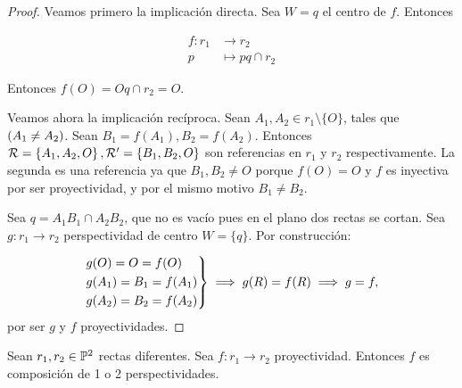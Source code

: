 \begin{proof}
    Veamos primero la implicación directa. Sea $W = {q}$
    el centro de $f$. Entonces

    \begin{align*}
	f : r_1 &\to r_2 \\
	p &\mapsto pq \cap r_2
    \end{align*}
    
    Entonces $f(O) = Oq \cap r_2 = O$.
    
    Veamos ahora la implicación recíproca. Sean $A_1, A_2 \in r_1
    \setminus \{O\}$, tales que $\left( A_1 \neq A_2\right)$. 
    Sean $B_1 = f(A_1), B_2 = f(A_2)$. Entonces $\mathcal{R} = \left \{ A_1, 
    A_2, O \right \}, \mathcal{R}' = \left \{ B_1, B_2, O \right \}$ son
    referencias en $r_1$ y $r_2$ respectivamente. La segunda 
    es una referencia ya que $B_1, B_2 \neq O$ porque $f(O) = O$ y
    $f$ es inyectiva por ser proyectividad, y por el mismo motivo
    $B_1 \neq B_2$.
    
    Sea $q = A_1B_1 \cap A_2B_2$, que no es vacío pues en el
    plano dos rectas se cortan. Sea $g \colon r_1 \to r_2$ 
    perspectividad de centro $W = \{ q\}$. Por construcción:
    
    \[
    \begin{rcases}
        g(O) = O = f(O) \\
        g(A_1) = B_1 = f(A_1) \\
        g(A_2) = B_2 = f(A_2)
    \end{rcases}
    \implies
    g(R) = f(R) \implies g = f,
    \]
    por ser $g$ y $f$ proyectividades.
\end{proof}
\begin{teo}
    \label{primer_teo_poncelet}
    Sean $r_1, r_2 \in \mathbb{P}^2$ rectas diferentes. Sea $f \colon 
    r_1 \to r_2$ proyectividad. Entonces $f$ es composición
    de 1 o 2 perspectividades.
\end{teo}
